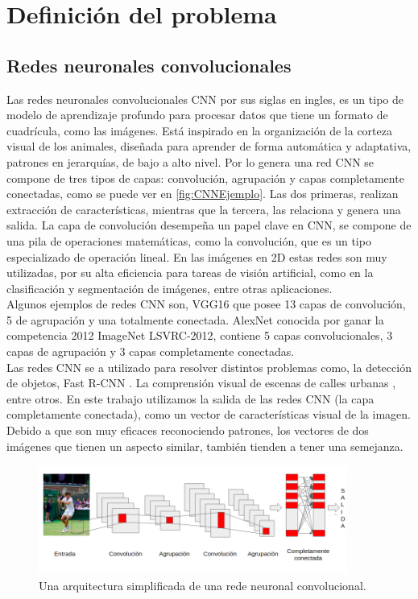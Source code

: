 \chapter{Definición del problema}\label{cap:trabajo_relacionado}


\section{Redes neuronales convolucionales}
Las redes neuronales convolucionales CNN por sus siglas en ingles, es un tipo de modelo de aprendizaje profundo para procesar datos que tiene un formato de cuadrícula, como las imágenes. Está inspirado en la organización de la corteza visual de los animales, diseñada para aprender de forma automática y adaptativa, patrones en jerarquías, de bajo a alto nivel. Por lo genera una red CNN se compone de tres tipos de capas: convolución, agrupación y capas completamente conectadas, como se puede ver en \autoref{fig:CNNEjemplo}. Las dos primeras, realizan extracción de características, mientras que la tercera, las relaciona  y genera una salida. La capa de convolución desempeña un papel clave en CNN, se compone de una pila de operaciones matemáticas, como la convolución, que es un tipo especializado de operación lineal. En las imágenes en 2D estas redes son muy utilizadas, por su alta eficiencia para tareas de visión artificial, como en la clasificación y segmentación de imágenes, entre otras aplicaciones.\\

Algunos ejemplos de redes CNN son, VGG16 que posee 13 capas de convolución, 5 de agrupación y una totalmente conectada. AlexNet conocida por ganar la competencia 2012 ImageNet LSVRC-2012, contiene 5 capas convolucionales, 3 capas de agrupación y 3 capas completamente conectadas.\\

Las redes CNN se a utilizado para resolver distintos problemas como, la detección de objetos, Fast R-CNN \cite{girshick2015fast}. La comprensión visual de escenas de calles urbanas \cite{cordts2016cityscapes}, entre otros.
En este trabajo utilizamos la salida de las redes CNN (la capa completamente conectada), como un vector de características visual de la imagen. Debido a que son muy eficaces reconociendo patrones, los vectores de dos imágenes que tienen un aspecto similar, también tienden a tener una semejanza. 

\begin{figure}
	\centering
	\includegraphics[width=0.9\textwidth]{img/red_cnn.png}
	\caption{Una arquitectura simplificada de una rede neuronal convolucional.}
	\label{fig:CNNEjemplo}
\end{figure}

